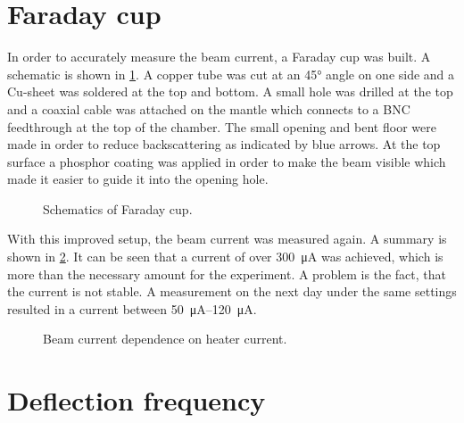\section{Faraday cup}
\label{sec:Faraday cup}


In order to accurately measure the beam current, a Faraday cup was built. A schematic is shown in \cref{fig:Schematics of Faraday cup}. A copper tube was cut at an \ang{45} angle on one side and a Cu-sheet was soldered at the top and bottom. A small hole  was drilled at the top and a coaxial cable was attached on the mantle which connects to a BNC feedthrough at the top of the chamber. The small opening and bent floor were made in order to reduce backscattering as indicated by blue arrows. At the top surface a phosphor coating was applied in order to make the beam visible which made it easier to guide it into the opening hole.


\begin{figure}[h]
	\centering
	\begin{tikzpicture}
		
	\end{tikzpicture}
	
	\caption{Schematics of Faraday cup.}
	\label{fig:Schematics of Faraday cup}
\end{figure}

With this improved setup, the beam current was measured again. A summary is shown in \cref{fig:Beam current dependence on heater current}. It can be seen that a current of over \SI{300}{\micro\ampere} was achieved, which is more than the necessary amount for the experiment. A problem is the fact, that the current is not stable. A measurement on the next day under the same settings resulted in a current between \SIrange{50}{120}{\micro\ampere}.

\begin{figure}[h]
	\centering
	\begin{tikzpicture}
		
	\end{tikzpicture}

	\caption{Beam current dependence on heater current.}
	\label{fig:Beam current dependence on heater current}
\end{figure}

\section{Deflection frequency}

